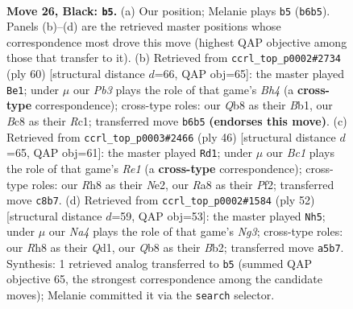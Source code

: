 \documentclass[11pt]{article}
\begin{document}
\clearpage

\begin{figure}[p]\centering
\begin{subfigure}{0.46\textwidth}\centering
\resizebox{\linewidth}{!}{%
\newchessgame
\chessboard[
  setfen={rqb1k2r/p3b1pp/1p6/n2p1p2/P2P3P/4P1PB/1B1N2K1/1Q2R3 b - - 0 26},
  showmover=false,
  pgfstyle=straightmove, color=movearrow, markmove={b6-b5}
]}
\caption{}
\end{subfigure}\hfill
\begin{subfigure}{0.46\textwidth}\centering
\resizebox{\linewidth}{!}{%
\newchessgame
\chessboard[
  setfen={4r1k1/p2b1pp1/2q4p/1p1p3P/n2P1Q1B/2P2P2/P5P1/1BR3K1 w - - 3 31},
  showmover=false,
  pgfstyle=straightmove, color=movearrow, markmove={h4-e1}
]}
\caption{}
\end{subfigure}
\\[4pt]
\begin{subfigure}{0.46\textwidth}\centering
\resizebox{\linewidth}{!}{%
\newchessgame
\chessboard[
  setfen={r2q1b1k/5pp1/7p/pp1P1b2/2p5/P3B2P/1P1QNPP1/4R1K1 w - - 0 24},
  showmover=false,
  pgfstyle=straightmove, color=movearrow, markmove={e1-d1}
]}
\caption{}
\end{subfigure}\hfill
\begin{subfigure}{0.46\textwidth}\centering
\resizebox{\linewidth}{!}{%
\newchessgame
\chessboard[
  setfen={b1qrn1k1/p3bpp1/1p2p2p/8/8/PP1BP1NP/1B1R1PP1/3Q2K1 w - - 13 27},
  showmover=false,
  pgfstyle=straightmove, color=movearrow, markmove={g3-h5}
]}
\caption{}
\end{subfigure}
\caption{\textbf{Move 26, Black: \texttt{b5}.} (a) Our position; Melanie plays \texttt{b5} (\texttt{b6b5}). Panels (b)--(d) are the retrieved master positions whose correspondence most drove this move (highest QAP objective among those that transfer to it). (b) Retrieved from \texttt{ccrl\_top\_p0002\#2734} (ply 60) [structural distance $d$=66, QAP obj=65]: the master played \texttt{Be1}; under $\mu$ our \emph{Pb3} plays the role of that game's \emph{Bh4} (a \textbf{cross-type} correspondence); cross-type roles: our \emph{Q}b8 as their \emph{B}b1, our \emph{B}c8 as their \emph{R}c1; transferred move \texttt{b6b5} \textbf{(endorses this move)}. (c) Retrieved from \texttt{ccrl\_top\_p0003\#2466} (ply 46) [structural distance $d$=65, QAP obj=61]: the master played \texttt{Rd1}; under $\mu$ our \emph{Bc1} plays the role of that game's \emph{Re1} (a \textbf{cross-type} correspondence); cross-type roles: our \emph{R}h8 as their \emph{N}e2, our \emph{R}a8 as their \emph{P}f2; transferred move \texttt{c8b7}. (d) Retrieved from \texttt{ccrl\_top\_p0002\#1584} (ply 52) [structural distance $d$=59, QAP obj=53]: the master played \texttt{Nh5}; under $\mu$ our \emph{Na4} plays the role of that game's \emph{Ng3}; cross-type roles: our \emph{R}h8 as their \emph{Q}d1, our \emph{Q}b8 as their \emph{B}b2; transferred move \texttt{a5b7}. Synthesis: 1 retrieved analog transferred to \texttt{b5} (summed QAP objective 65, the strongest correspondence among the candidate moves); Melanie committed it via the \texttt{search} selector.}
\label{fig:thought-m51}
\end{figure}
\end{document}
